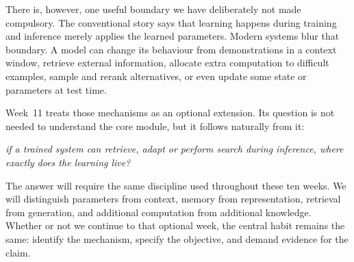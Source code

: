 There is, however, one useful boundary we have deliberately not made compulsory. The conventional story says that learning happens during training and inference merely applies the learned parameters. Modern systems blur that boundary. A model can change its behaviour from demonstrations in a context window, retrieve external information, allocate extra computation to difficult examples, sample and rerank alternatives, or even update some state or parameters at test time.

Week~11 treats those mechanisms as an optional extension. Its question is not needed to understand the core module, but it follows naturally from it:
\begin{center}
  \emph{if a trained system can retrieve, adapt or perform search during inference, where exactly does the learning live?}
\end{center}

The answer will require the same discipline used throughout these ten weeks. We will distinguish parameters from context, memory from representation, retrieval from generation, and additional computation from additional knowledge. Whether or not we continue to that optional week, the central habit remains the same: identify the mechanism, specify the objective, and demand evidence for the claim.
